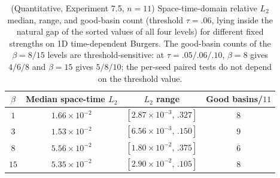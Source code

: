 \documentclass[11pt]{article}
\numberwithin{equation}{section}
\begin{document}
\begin{table}[ht]\centering\small\renewcommand{\arraystretch}{1.2}
\begin{tabular}{cccc}
\toprule
$\beta$ & Median space-time $L_2$ & $L_2$ range & Good basins/$11$\\
\midrule
$1$  & $1.66\times10^{-2}$ & $[2.87\times10^{-3},\,.327]$ & $8$\\
$3$  & $1.53\times10^{-2}$ & $[6.56\times10^{-3},\,.150]$ & $9$\\
$8$  & $5.56\times10^{-2}$ & $[1.80\times10^{-2},\,.375]$ & $6$\\
$15$ & $5.35\times10^{-2}$ & $[2.90\times10^{-2},\,.105]$ & $8$\\
\bottomrule
\end{tabular}
\caption{(Quantitative, Experiment 7.5, $n=11$) Space-time-domain relative $L_2$ median, range, and good-basin count (threshold $\tau=.06$, lying inside the natural gap of the sorted values of all four levels) for different fixed strengths on 1D time-dependent Burgers. The good-basin counts of the $\beta=8/15$ levels are threshold-sensitive: at $\tau=.05/.06/.10$, $\beta=8$ gives $4/6/8$ and $\beta=15$ gives $5/8/10$; the per-seed paired tests do not depend on the threshold value.}\label{tab:d1beta}
\end{table}
\end{document}
